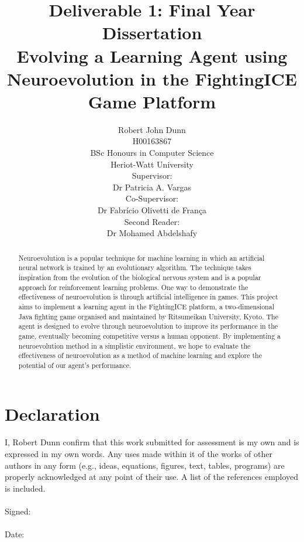 \documentclass[12pt,a4paper]{article}
\begin{document}
\title{
Deliverable 1: Final Year Dissertation\\
\vspace{10mm}
Evolving a Learning Agent using Neuroevolution in the FightingICE Game Platform\\
\vspace{25mm}
}
\date{}
\author{Robert John Dunn\\
H00163867\\
BSc Honours in Computer Science\\
Heriot-Watt University\vspace{15mm}\\
Supervisor:\\
Dr Patricia A. Vargas\vspace{3mm}\\
Co-Supervisor:\\
Dr Fabrício Olivetti de França\vspace{3mm}\\
Second Reader:\\
Dr Mohamed Abdelshafy
}
\maketitle
\newpage
\vspace*{30mm}
\section*{Declaration}
I,  Robert Dunn confirm that this work submitted for assessment is my own and is expressed
in my own words. Any uses made within it of the works of other authors in any
form (e.g., ideas, equations, figures, text, tables, programs) are properly acknowledged
at any point of their use. A list of the references employed is included.\\
\\
Signed:\\
\\
Date: 
\newpage
\begin{abstract}
Neuroevolution is a popular technique for machine learning in which an artificial neural network is trained by an evolutionary algorithm. The technique takes inspiration from the evolution of the biological nervous system and is a popular approach for reinforcement learning problems. One way to demonstrate the effectiveness of neuroevolution is through artificial intelligence in games. This project aims to implement a learning agent in the FightingICE platform, a two-dimensional Java fighting game organised and maintained by Ritsumeikan University, Kyoto. The agent is designed to evolve through neuroevolution to improve its performance in the game, eventually becoming competitive versus a human opponent. By implementing a neuroevolution method in a simplistic environment, we hope to evaluate the effectiveness of neuroevolution as a method of machine learning and explore the potential of our agent's performance.
\end{abstract}
\newpage
\tableofcontents
\newpage
\end{document}

